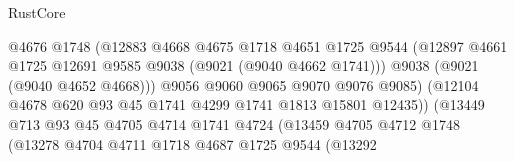\begin{lexlean}{RustCore}
\begin{coremodule}
                                        @4676
                                        @1748
                                        (@12883
                                          @4668
                                          @4675
                                          @1718
                                          @4651
                                          @1725
                                          @9544
                                          (@12897
                                            @4661
                                            @1725
                                            @12691
                                            @9585
                                            @9038
                                            (@9021 (@9040 @4662 @1741)))
                                          @9038
                                          (@9021 (@9040 @4652 @4668)))
                                        @9056
                                        @9060
                                        @9065
                                        @9070
                                        @9076
                                        @9085)
                                      (@12104
                                        @4678
                                        @620
                                        @93
                                        @45
                                        @1741
                                        @4299
                                        @1741
                                        @1813
                                        @15801
                                        @12435))
                                    (@13449
                                      @713
                                      @93
                                      @45
                                      @4705
                                      @4714
                                      @1741
                                      @4724
                                      (@13459
                                        @4705
                                        @4712
                                        @1748
                                        (@13278
                                          @4704
                                          @4711
                                          @1718
                                          @4687
                                          @1725
                                          @9544
                                          (@13292

\end{coremodule}
\end{lexlean}
